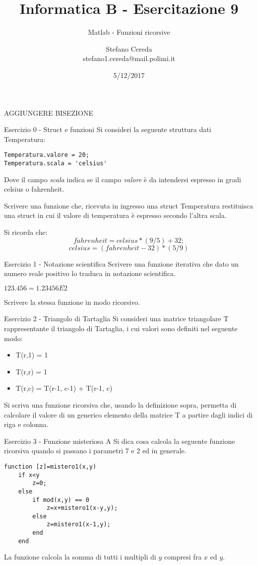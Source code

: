 \documentclass[handout]{beamer}
\title{Informatica B - Esercitazione 9}
\subtitle{Matlab - Funzioni ricorsive}
\author{Stefano Cereda\\
		stefano1.cereda@mail.polimi.it
	}
\date{5/12/2017}
\institute[PoliMi]{\vspace{0.5cm}\centering Politecnico di Milano \\ \vspace{0.2cm}
	\texttt{[image: ./logopolimi]}}
\begin{document}
\begin{frame}
	\maketitle
	AGGIUNGERE BISEZIONE
\end{frame}

\begin{frame}[fragile]{Esercizio 0 - Struct e funzioni}
	Si consideri la seguente struttura dati Temperatura:
	\begin{lstlisting}
Temperatura.valore = 20;
Temperatura.scala = 'celsius'
	\end{lstlisting}
	Dove il campo \emph{scala} indica se il campo \emph{valore} è da intendersi espresso in gradi celsius o fahrenheit.
	
	Scrivere una funzione che, ricevuta in ingresso una struct Temperatura restituisca una struct in cui il valore di temperatura è espresso secondo l'altra scala.
	
	Si ricorda che: \[fahrenheit = celsius * (9/5) + 32;\] 	\[celsius = (fahrenheit -32) * (5/9)\]
\end{frame}

\begin{frame}{Esercizio 1 - Notazione scientifica}
	Scrivere una funzione iterativa che dato un numero reale positivo lo traduca in notazione scientifica.
	
	$123.456 = 1.23456E2$
	
	Scrivere la stessa funzione in modo ricorsivo.
\end{frame}

\begin{frame}{Esercizio 2 - Triangolo di Tartaglia}
	Si consideri una matrice triangolare T rappresentante il triangolo di Tartaglia, i cui valori sono definiti nel seguente modo:
	\begin{itemize}
		\item T(r,1) = 1
		\item T(r,r) = 1
		\item T(r,c) = T(r-1, c-1) + T(r-1, c)
	\end{itemize}

	Si scriva una funzione ricorsiva che, usando la definizione sopra, permetta di calcolare il valore di un generico elemento della matrice T a partire dagli indici di riga e colonna.
\end{frame}

\begin{frame}[fragile]{Esercizio 3 - Funzione misteriosa A}
	Si dica cosa calcola la seguente funzione ricorsiva quando si passano i parametri 7 e 2 ed in generale.
	
\begin{lstlisting}
function [z]=mistero1(x,y)
	if x<y
		z=0;
	else
		if mod(x,y) == 0
			z=x+mistero1(x-y,y);
		else
			z=mistero1(x-1,y);
		end
	end
	\end{lstlisting}
	
	\pause
	La funzione calcola la somma di tutti i multipli di $y$ compresi fra $x$ ed $y$.
\end{frame}
\end{document}
